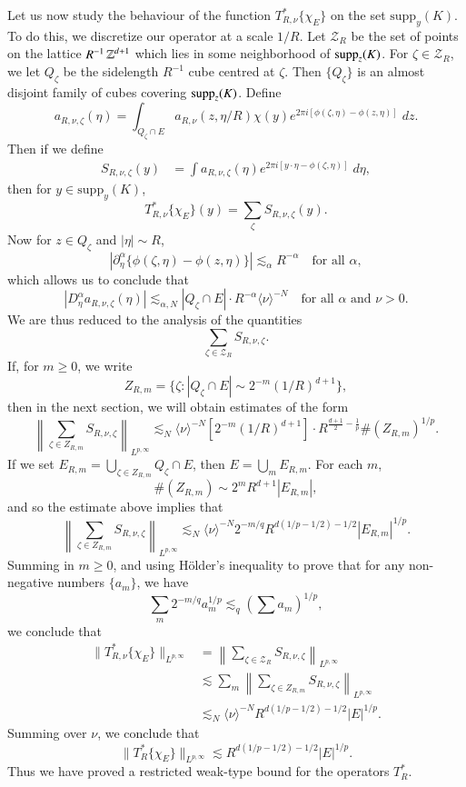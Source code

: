 Let us now study the behaviour of the function $T_{R,\nu}^* \{ \chi_E \}$ on the set $\text{supp}_y(K)$. To do this, we discretize our operator at a scale $1/R$. Let $\mathcal{Z}_R$ be the set of points on the lattice $R^{-1} \operatorname{\mathbb{Z}}^{d+1}$ which lies in some neighborhood of $\operatorname{\text{supp}}_z(K)$. For $\zeta \in \mathcal{Z}_R$, we let $Q_\zeta$ be the sidelength $R^{-1}$ cube centred at $\zeta$. Then $\{ Q_\zeta \}$ is an almost disjoint family of cubes covering $\operatorname{\text{supp}}_z(K)$. Define
%
\[ a_{R,\nu,\zeta}(\eta) = \int_{Q_\zeta \cap E} a_{R,\nu}(z,\eta / R) \chi(y) e^{2 \pi i [ \phi(\zeta,\eta) - \phi(z,\eta) ]}\; dz. \]
%
Then if we define
%
\begin{align*}
    S_{R,\nu,\zeta}(y) &= \int a_{R,\nu,\zeta}(\eta) e^{2 \pi i [ y \cdot \eta - \phi(\zeta,\eta) ]}\; d\eta,
\end{align*}
%
then for $y \in \text{supp}_y(K)$,
%
\[ T_{R,\nu}^* \{ \chi_E \}(y) = \sum_\zeta S_{R,\nu,\zeta}(y). \]
%
Now for $z \in Q_\zeta$ and $|\eta| \sim R$,
%
\[ |\partial_\eta^\alpha \{ \phi(\zeta, \eta) - \phi(z,\eta) \}| \lesssim_\alpha R^{-\alpha} \quad\text{for all $\alpha$}, \]
%
which allows us to conclude that
%
\[ |D^\alpha_\eta a_{R,\nu,\zeta}(\eta)| \lesssim_{\alpha,N} |Q_\zeta \cap E| \cdot R^{-\alpha} \langle \nu \rangle^{-N} \quad\text{for all $\alpha$ and $\nu > 0$}. \]
%
We are thus reduced to the analysis of the quantities
%
\[ \sum_{\zeta \in \mathcal{Z}_R} S_{R,\nu,\zeta}. \]
%
If, for $m \geq 0$, we write
%
\[ Z_{R,m} = \{ \zeta: |Q_\zeta \cap E| \sim 2^{-m} (1/R)^{d+1} \}, \]
%
then in the next section, we will obtain estimates of the form
%
\[ \left\| \sum_{\zeta \in Z_{R,m}} S_{R,\nu,\zeta} \right\|_{L^{p,\infty}} \lesssim_N \langle \nu \rangle^{-N} [2^{-m} (1/R)^{d+1}] \cdot R^{ \frac{d+1}{2} - \frac{1}{p} } \#(Z_{R,m})^{1/p}. \]
%
If we set $E_{R,m} = \bigcup_{\zeta \in Z_{R,m}} Q_\zeta \cap E$, then $E = \bigcup_m E_{R,m}$. For each $m$,
%
\[ \#(Z_{R,m}) \sim 2^m R^{d+1} |E_{R,m}|, \]
%
and so the estimate above implies that
%
\[ \left\| \sum_{\zeta \in Z_{R,m}} S_{R,\nu,\zeta} \right\|_{L^{p,\infty}} \lesssim_N \langle \nu \rangle^{-N} 2^{-m / q} R^{d(1/p - 1/2) - 1/2} |E_{R,m}|^{1/p}. \]
%
Summing in $m \geq 0$, and using H\"{o}lder's inequality to prove that for any non-negative numbers $\{ a_m \}$, we have
%
\[ \sum_m 2^{-m/q} a_m^{1/p} \lesssim_q ( \sum a_m )^{1/p}, \]
%
we conclude that
%
\begin{align*}
    \| T_{R,\nu}^* \{ \chi_E \} \|_{L^{p,\infty}} &= \left\| \sum_{\zeta \in \mathcal{Z}_R} S_{R,\nu,\zeta} \right\|_{L^{p,\infty}}\\
    &\lesssim \sum_m \left\| \sum_{\zeta \in Z_{R,m}} S_{R,\nu,\zeta} \right\|_{L^{p,\infty}}\\
    &\lesssim_N \langle \nu \rangle^{-N} R^{d(1/p - 1/2) - 1/2} |E|^{1/p}.
\end{align*}
%
Summing over $\nu$, we conclude that
%
\[ \| T_R^* \{ \chi_E \} \|_{L^{p,\infty}} \lesssim R^{d(1/p - 1/2) - 1/2} |E|^{1/p}. \]
%
Thus we have proved a restricted weak-type bound for the operators $T_R^*$.

